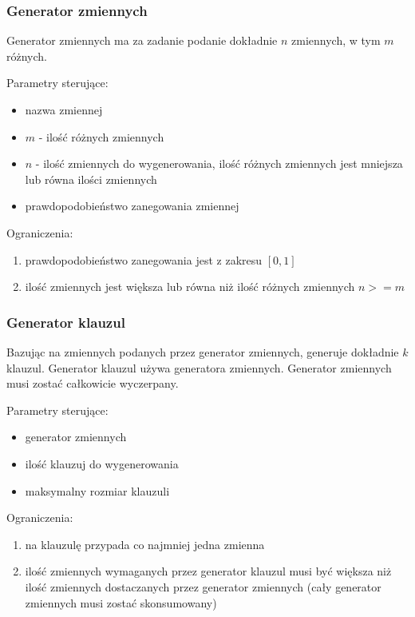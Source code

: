 \documentclass[a4paper,12pt]{article}
\begin{document}
\subsubsection{Generator zmiennych}

Generator zmiennych ma za zadanie podanie dokładnie $n$ zmiennych, w tym $m$ różnych.

Parametry sterujące:

\begin{itemize}
  \item nazwa zmiennej
  \item $m$ - ilość różnych zmiennych
  \item $n$ - ilość zmiennych do wygenerowania, ilość różnych zmiennych jest mniejsza lub równa ilości zmiennych
  \item prawdopodobieństwo zanegowania zmiennej
\end{itemize}

Ograniczenia:
\begin{enumerate}
  \item prawdopodobieństwo zanegowania jest z zakresu $[0,1]$
  \item ilość zmiennych jest większa lub równa niż ilość różnych zmiennych $n>=m$
\end{enumerate}

\subsubsection{Generator klauzul}

Bazując na zmiennych podanych przez generator zmiennych, generuje dokładnie $k$ klauzul. Generator klauzul używa generatora zmiennych. Generator zmiennych musi zostać całkowicie wyczerpany.

Parametry sterujące:

\begin{itemize}
  \item generator zmiennych
  \item ilość klauzuj do wygenerowania
  \item maksymalny rozmiar klauzuli
\end{itemize}

Ograniczenia:
\begin{enumerate}
  \item na klauzulę przypada co najmniej jedna zmienna
  \item ilość zmiennych wymaganych przez generator klauzul musi być większa niż ilość zmiennych dostaczanych przez generator zmiennych (cały generator zmiennych musi zostać skonsumowany)
\end{enumerate}
\end{document}
